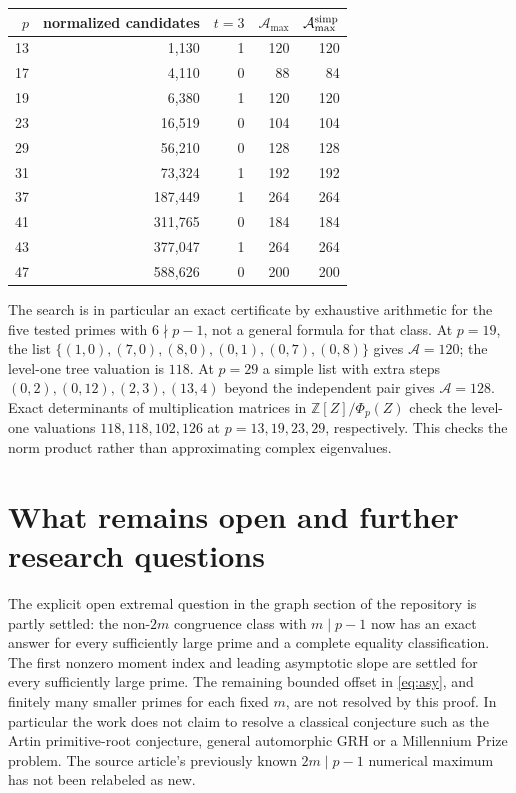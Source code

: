 \documentclass[11pt]{article}
\theoremstyle{remark}\newtheorem{remark}[theorem]{Remark}
\newcommand{\Z}{\mathbb Z}
\newcommand{\A}{\mathcal A}
\begin{document}
\begin{center}
\begin{tabular}{rrrrr}
\toprule
$p$ & normalized candidates & $t=3$ & $\A_{\max}$ & $\A_{\max}^{\rm simp}$\\
\midrule
13 & 1,130 & 1 & 120 & 120\\
17 & 4,110 & 0 & 88 & 84\\
19 & 6,380 & 1 & 120 & 120\\
23 & 16,519 & 0 & 104 & 104\\
29 & 56,210 & 0 & 128 & 128\\
31 & 73,324 & 1 & 192 & 192\\
37 & 187,449 & 1 & 264 & 264\\
41 & 311,765 & 0 & 184 & 184\\
43 & 377,047 & 1 & 264 & 264\\
47 & 588,626 & 0 & 200 & 200\\
\bottomrule
\end{tabular}
\end{center}
The search is in particular an exact certificate by exhaustive arithmetic for the five tested primes with $6\nmid p-1$, not a general formula for that class. At $p=19$, the list $\{(1,0),(7,0),(8,0),(0,1),(0,7),(0,8)\}$ gives $\A=120$; the level-one tree valuation is $118$. At $p=29$ a simple list with extra steps $(0,2),(0,12),(2,3),(13,4)$ beyond the independent pair gives $\A=128$. Exact determinants of multiplication matrices in $\Z[Z]/\Phi_p(Z)$ check the level-one valuations $118,118,102,126$ at $p=13,19,23,29$, respectively. This checks the norm product rather than approximating complex eigenvalues.

\section{What remains open and further research questions}
The explicit open extremal question in the graph section of the repository is partly settled: the non-$2m$ congruence class with $m\mid p-1$ now has an exact answer for every sufficiently large prime and a complete equality classification. The first nonzero moment index and leading asymptotic slope are settled for every sufficiently large prime. The remaining bounded offset in \eqref{eq:asy}, and finitely many smaller primes for each fixed $m$, are not resolved by this proof. In particular the work does not claim to resolve a classical conjecture such as the Artin primitive-root conjecture, general automorphic GRH or a Millennium Prize problem. The source article's previously known $2m\mid p-1$ numerical maximum has not been relabeled as new.
\end{document}
